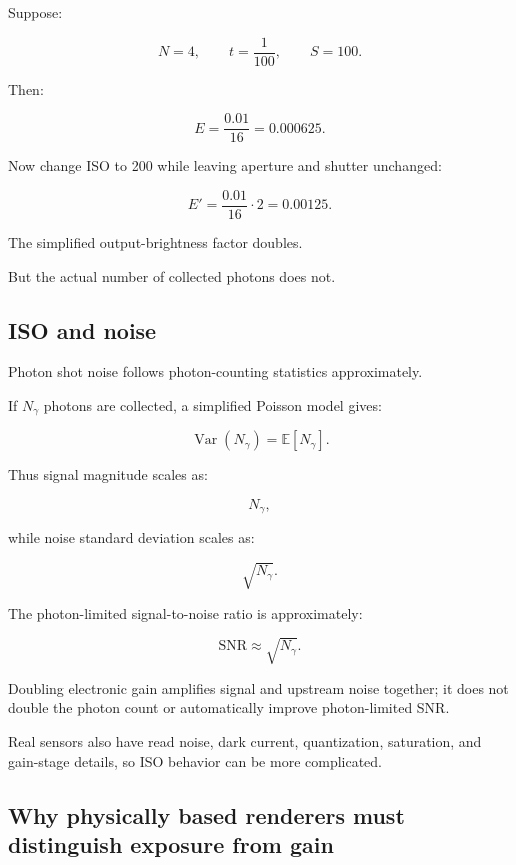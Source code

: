 \hypertarget{02-foundations-ii-ch036-numerical-example-v11.17.21}{}

Suppose:

\[ N=4,\qquad t=\frac1{100},\qquad S=100. \]

Then:

\[ E=\frac{0.01}{16}=\boxed{0.000625}. \]

Now change ISO to 200 while leaving aperture and shutter unchanged:

\[ E'=\frac{0.01}{16}\cdot2 =\boxed{0.00125}. \]

The simplified output-brightness factor doubles.

But the actual number of collected photons does not.

\subsection{ISO and noise}\label{02-foundations-ii-ch036-iso-and-noise}

\hypertarget{02-foundations-ii-ch036-iso-and-noise}{}

Photon shot noise follows photon-counting statistics approximately.

If \(N_\gamma\) photons are collected, a simplified Poisson model gives:

\[ \operatorname{Var}(N_\gamma)=\mathbb E[N_\gamma]. \]

Thus signal magnitude scales as:

\[ N_\gamma, \]

while noise standard deviation scales as:

\[ \sqrt{N_\gamma}. \]

The photon-limited signal-to-noise ratio is approximately:

\[ \boxed{ \mathrm{SNR}\approx\sqrt{N_\gamma}. } \]

Doubling electronic gain amplifies signal and upstream noise together; it does not double the photon count or automatically improve photon-limited SNR.

Real sensors also have read noise, dark current, quantization, saturation, and gain-stage details, so ISO behavior can be more complicated.

\subsection{Why physically based renderers must distinguish exposure from gain}\label{02-foundations-ii-ch036-why-physically-based-renderers-must-distinguish-exposure-from-gain}

